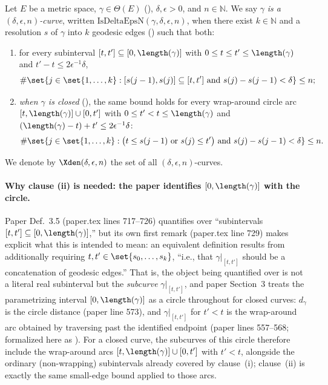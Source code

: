 \begin{definition}
  Let $E$ be a metric space, $\gamma \in \Theta(E)$ (), $\delta,\epsilon > 0$, and
  $n \in \mathbb{N}$. We say $\gamma$ \emph{is a $(\delta,\epsilon,n)$-curve}, written
  $\mathrm{IsDeltaEpsN}(\gamma,\delta,\epsilon,n)$, when there exist $k \in \mathbb{N}$ and a
  resolution $s$ of $\gamma$ into $k$ geodesic edges () such that
  both:
  \begin{enumerate}
    \item[(i)] for every subinterval $[t,t'] \subseteq [0,\length(\gamma)]$ with $0 \leq t \leq t'
    \leq \length(\gamma)$ and $t' - t \leq 2\epsilon^{-1}\delta$,
    \[
      \#\set{j \in \set{1,\dotsc,k} : [s(j-1),s(j)] \subseteq [t,t'] \text{ and } s(j)-s(j-1) < \delta}
      \leq n
      ;
    \]
    \item[(ii)] \emph{when $\gamma$ is closed} (), the same bound holds for
    every wrap-around circle arc $[t,\length(\gamma)] \cup [0,t']$ with $0 \leq t' < t \leq
    \length(\gamma)$ and $(\length(\gamma) - t) + t' \leq 2\epsilon^{-1}\delta$:
    \[
      \#\set{j \in \set{1,\dotsc,k} :
        \bigl(t \leq s(j-1) \text{ or } s(j) \leq t'\bigr) \text{ and } s(j)-s(j-1) < \delta}
      \leq n
      .
    \]
  \end{enumerate}
  We denote by $\Xden(\delta,\epsilon,n)$ the set of all $(\delta,\epsilon,n)$-curves.

  \paragraph{Why clause (ii) is needed: the paper identifies $[0,\length(\gamma)]$ with the circle.}
  Paper Def.~3.5 (paper.tex lines 717--726) quantifies over ``subintervals $[t,t'] \subseteq
  [0,\length(\gamma)]$,'' but its own first remark (paper.tex line 729) makes explicit what this
  is intended to mean: an equivalent definition results from additionally requiring $t,t' \in
  \set{s_0,\dotsc,s_k}$, ``i.e., that $\gamma|_{[t,t']}$ should be a concatenation of geodesic
  edges.'' That is, the object being quantified over is not a literal real subinterval but the
  \emph{subcurve} $\gamma|_{[t,t']}$, and paper Section~3 treats the parametrizing interval
  $[0,\length(\gamma)]$ as a circle throughout for closed curves: $d_\gamma$ is the circle distance
  (paper line 573), and $\gamma|_{[t,t']}$ for $t' < t$ is the wrap-around arc obtained by
  traversing past the identified endpoint (paper lines 557--568; formalized here as
  ). For a closed curve, the subcurves of this circle therefore include
  the wrap-around arcs $[t,\length(\gamma)]\cup[0,t']$ with $t' < t$, alongside the ordinary
  (non-wrapping) subintervals already covered by clause~(i); clause~(ii) is exactly the same
  small-edge bound applied to those arcs.


\end{definition}
